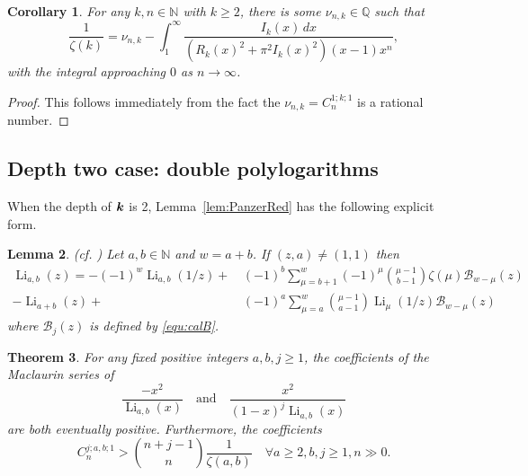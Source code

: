 \documentclass[11pt]{article}
\newcommand{\calB}{{\mathcal B}}
\newcommand{\bfk}{{\boldsymbol{\sl{k}}}}
\DeclareMathOperator{\Li}{Li}
\def\N{\mathbb{N}}
\def\Q{\mathbb{Q}}
\theoremstyle{plain}
\newtheorem{thm}{Theorem}[section]
\newtheorem{lem}[thm]{Lemma}
\newtheorem{cor}[thm]{Corollary}
\theoremstyle{definition}
\begin{document}
\begin{cor}\label{cor:ratZeta(k)}
For any $k,n\in\N$ with $k\ge 2$, there is some $\nu_{n,k}\in\Q$ such that
\begin{equation*}
    \frac{1}{\zeta(k)}=\nu_{n,k}-\int_1^\infty\frac{I_k(x)\, dx}{(R_k(x)^2+\pi^2 I_k(x)^2)(x-1) x^n},
\end{equation*}
with the integral approaching $0$ as $n\to\infty$.
\end{cor}
\begin{proof}
This follows immediately from the fact the $\nu_{n,k}=C_{n}^{1;k;1}$ is a rational number.
\end{proof}


\subsection{Depth two case: double polylogarithms}

When the depth of $\bfk$ is 2, Lemma~\ref{lem:PanzerRed} has the following explicit form.


\begin{lem} \label{lem:PanzerDepth2Red} \emph{(cf. \cite[(3.2)]{Panzer2017})}
Let $a,b\in\N$ and $w=a+b$. If $(z,a)\ne (1,1)$ then
\begin{align*}
\Li_{a,b}(z)=-(-1)^w \Li_{a,b}(1/z)+&\, (-1)^b \sum_{\mu=b+1}^w (-1)^\mu \binom{\mu-1}{b-1} \zeta(\mu) \calB_{w-\mu}(z)\\
-\Li_{a+b}(z)+&\,(-1)^a \sum_{\mu=a}^w \binom{\mu-1}{a-1} \Li_\mu(1/z) \calB_{w-\mu}(z)
\end{align*}
where $\calB_j(z)$ is defined by \eqref{equ:calB}.
\end{lem}


\begin{thm}\label{thm:TrivarDepth2}
For any fixed positive integers $a,b,j\ge 1$, the coefficients of the Maclaurin series of
\begin{equation*}
\frac{-x^2}{\Li_{a,b}(x)} \quad\text{and}\quad  \frac{x^2}{(1-x)^j\Li_{a,b}(x)}
\end{equation*}
are both eventually positive. Furthermore, the coefficients
\begin{equation*}
C_{n}^{j;a,b;1}>\binom{n+j-1}{n}\frac{1}{\zeta(a,b)}\quad \forall a\ge 2, b,j\ge 1,  n\gg 0.
\end{equation*}
\end{thm}
\end{document}
